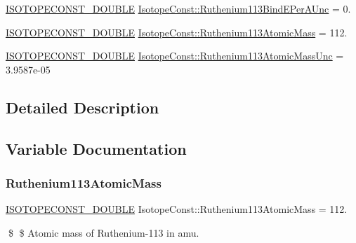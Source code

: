 \begin{DoxyCompactItemize}
\mbox{\hyperlink{group___isotope_const-_macros_ga8f45a7272ce02c0b4c65c44636ed719a}{I\+S\+O\+T\+O\+P\+E\+C\+O\+N\+S\+T\+\_\+\+D\+O\+U\+B\+LE}} \mbox{\hyperlink{group___isotope_const-_ruthenium-_ru113_gae5772163024a7651513f98ae00897e2d}{Isotope\+Const\+::\+Ruthenium113\+Bind\+E\+Per\+A\+Unc}} = 0.
\item 
\mbox{\hyperlink{group___isotope_const-_macros_ga8f45a7272ce02c0b4c65c44636ed719a}{I\+S\+O\+T\+O\+P\+E\+C\+O\+N\+S\+T\+\_\+\+D\+O\+U\+B\+LE}} \mbox{\hyperlink{group___isotope_const-_ruthenium-_ru113_ga461f9ceb1c918f00d70fb023b4a5a6f3}{Isotope\+Const\+::\+Ruthenium113\+Atomic\+Mass}} = 112.
\item 
\mbox{\hyperlink{group___isotope_const-_macros_ga8f45a7272ce02c0b4c65c44636ed719a}{I\+S\+O\+T\+O\+P\+E\+C\+O\+N\+S\+T\+\_\+\+D\+O\+U\+B\+LE}} \mbox{\hyperlink{group___isotope_const-_ruthenium-_ru113_gadbc5634915a1508e0e2c70fa0cf98ef3}{Isotope\+Const\+::\+Ruthenium113\+Atomic\+Mass\+Unc}} = 3.\+9587e-\/05
\end{DoxyCompactItemize}


\subsection{Detailed Description}


\subsection{Variable Documentation}
\mbox{\label{group___isotope_const-_ruthenium-_ru113_ga461f9ceb1c918f00d70fb023b4a5a6f3}} 
\subsubsection{\texorpdfstring{Ruthenium113\+Atomic\+Mass}{Ruthenium113AtomicMass}}
{\footnotesize\ttfamily \mbox{\hyperlink{group___isotope_const-_macros_ga8f45a7272ce02c0b4c65c44636ed719a}{I\+S\+O\+T\+O\+P\+E\+C\+O\+N\+S\+T\+\_\+\+D\+O\+U\+B\+LE}} Isotope\+Const\+::\+Ruthenium113\+Atomic\+Mass = 112.}

\$ \$ Atomic mass of Ruthenium-\/113 in amu. \mbox{\label{group___isotope_const-_ruthenium-_ru113_gadbc5634915a1508e0e2c70fa0cf98ef3}} 
